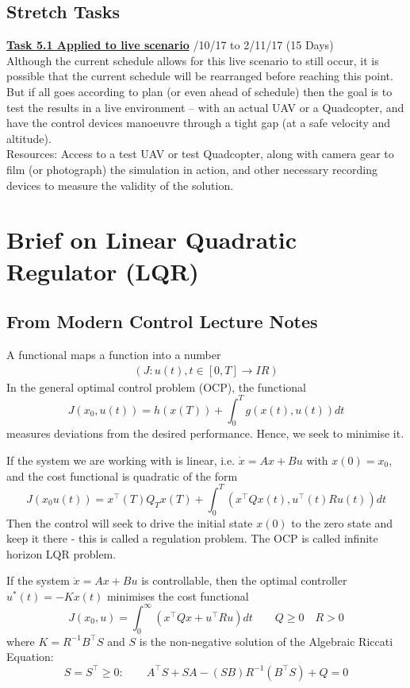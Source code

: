\documentclass[11pt,draftd]{article}
\def\Real{I\!R}
\begin{document}
\begin{appendices}
	\subsection{Stretch Tasks}
	\underline{\textbf{Task 5.1 Applied to live scenario}} /10/17 to 2/11/17 (15 Days) \\
	
	\noindent Although the current schedule allows for this live scenario to still occur, it is possible that the current schedule will be rearranged before reaching this point. But if all goes according to plan (or even ahead of schedule) then the goal is to test the results in a live environment – with an actual UAV or a Quadcopter, and have the control devices manoeuvre through a tight gap (at a safe velocity and altitude). \\
	Resources: Access to a test UAV or test Quadcopter, along with camera gear to film (or photograph) the simulation in action, and other necessary recording devices to measure the validity of the solution. 
	\newpage
	
	\section{Brief on Linear Quadratic Regulator (LQR)}\label{app_itemC}
	\subsection{From Modern Control Lecture Notes}
	A functional maps a function into a number
	\begin{align}
	(J:u(t),t\in[0,T]\rightarrow \Real)
	\end{align}
	In the general optimal control problem (OCP), the functional 
	\[ J(x_{0},u(t)) = h(x(T)) + \int_{0}^{T}g(x(t),u(t))dt\]
	measures deviations from the desired performance. Hence, we seek to minimise it.
	
	If the system we are working with is linear, i.e. $ \dot{x} = Ax + Bu$ with $ x(0) = x_{0} $, and the cost functional is quadratic of the form
	\begin{equation}
	J(x_{0}u(t)) = x^{\intercal}(T)Q_{T}x(T) + \int_{0}^{T}(x^{\intercal}Qx(t), u^{\intercal}(t)Ru(t))dt
	\end{equation}
	Then the control will seek to drive the initial state $ x(0) $ to the zero state and keep it there - this is called a regulation problem. The OCP is called infinite horizon LQR problem.
	
	If the system $ \dot{x} = Ax + Bu$ is controllable, then the optimal controller $ u^{*}(t) = -Kx(t) $ minimises the cost functional
	\begin{equation}
	J(x_{0},u) = \int_{0}^{\infty} (x^{\intercal}Qx + u^{\intercal}Ru)dt \qquad Q\ge 0 \quad R > 0
	\end{equation}
	where $ K = R^{-1}B^{\intercal}S $ and $ S $ is the non-negative solution of the Algebraic Riccati Equation:
	\begin{equation}
	S = S^{\intercal}\ge 0: \qquad A^{\intercal}S + SA - (SB)R^{-1}(B^{\intercal}S) + Q = 0
	\end{equation}
	

\end{appendices}
\end{document}
